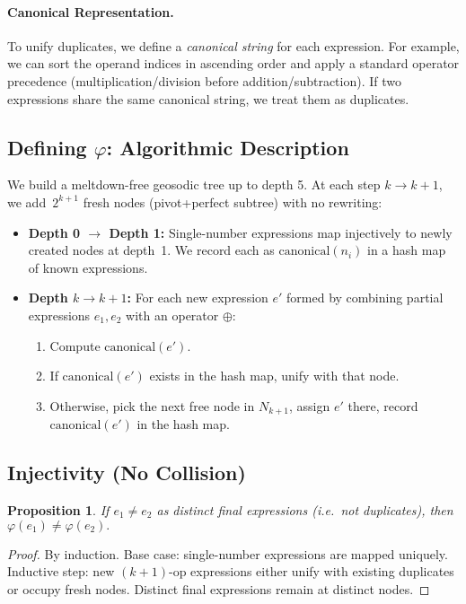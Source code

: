 \documentclass[acmsmall]{acmart}
\newtheorem{proposition}[theorem]{Proposition}
\theoremstyle{definition}
\theoremstyle{remark}
\begin{document}
\paragraph{Canonical Representation.}
To unify duplicates, we define a \emph{canonical string} for each expression. For example,
we can sort the operand indices in ascending order and apply a standard operator
precedence (multiplication/division before addition/subtraction). If two expressions
share the same canonical string, we treat them as duplicates.

\subsection{Defining \(\varphi\): Algorithmic Description}
We build a meltdown-free geosodic tree up to depth 5. At each step \(k\to k+1\),
we add \(\,2^{k+1}\) fresh nodes (pivot+perfect subtree) with no rewriting:

\begin{itemize}[leftmargin=*]
\item \textbf{Depth 0 \(\to\) Depth 1:}  
  Single-number expressions map injectively to newly created nodes at depth~1.
  We record each as \(\text{canonical}(n_i)\) in a hash map of known expressions.
\item \textbf{Depth \(k\to k+1\):}  
  For each new expression \(e'\) formed by combining partial expressions
  \(e_1, e_2\) with an operator \(\oplus\):
  \begin{enumerate}[leftmargin=*]
    \item Compute \(\text{canonical}(e')\).
    \item If \(\text{canonical}(e')\) exists in the hash map, unify with that node.
    \item Otherwise, pick the next free node in $N_{k+1}$, assign $e'$ there,
          record \(\text{canonical}(e')\) in the hash map.
  \end{enumerate}
\end{itemize}

\subsection{Injectivity (No Collision)}
\begin{proposition}
If $e_1 \neq e_2$ as distinct final expressions (i.e.\ not duplicates),
then $\varphi(e_1)\neq \varphi(e_2).$
\end{proposition}
\begin{proof}
By induction. Base case: single-number expressions are mapped uniquely. Inductive
step: new $(k+1)$-op expressions either unify with existing duplicates or
occupy fresh nodes. Distinct final expressions remain at distinct nodes.
\end{proof}
\end{document}
